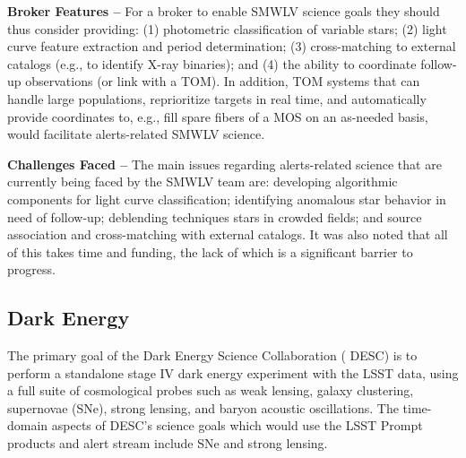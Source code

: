 {\bf  {Broker} Features --}
For a broker to enable  {SMWLV} science goals they should thus consider providing: 
(1) photometric classification of variable stars;
(2) light curve feature extraction and period determination;
(3) cross-matching to external catalogs (e.g., to identify X-ray binaries); and
(4) the ability to coordinate follow-up observations (or link with a  {TOM}). 
In addition,  {TOM} systems that can handle large populations, reprioritize targets in real time, and automatically provide coordinates to, e.g., fill spare fibers of a  {MOS} on an as-needed basis, would facilitate alerts-related  {SMWLV} science.

{\bf Challenges Faced --}
The main issues regarding alerts-related science that are currently being faced by the  {SMWLV} team are: 
developing algorithmic components for light curve classification;
identifying anomalous star behavior in need of follow-up; 
deblending techniques stars in crowded fields; and
source association and cross-matching with external catalogs.
It was also noted that all of this takes time and funding, the lack of which is a significant barrier to progress.

\subsection{Dark Energy}\label{ssec:sci_desc}

The primary goal of the Dark Energy  {Science Collaboration} ( {DESC}) is to perform a standalone stage  {IV} dark energy experiment with the  {LSST} data, using a full suite of cosmological probes such as weak lensing, galaxy clustering, supernovae (SNe), strong lensing, and baryon acoustic oscillations.
The time-domain aspects of  {DESC}'s science goals which would use the  {LSST} Prompt products and alert stream include SNe and strong lensing. 

